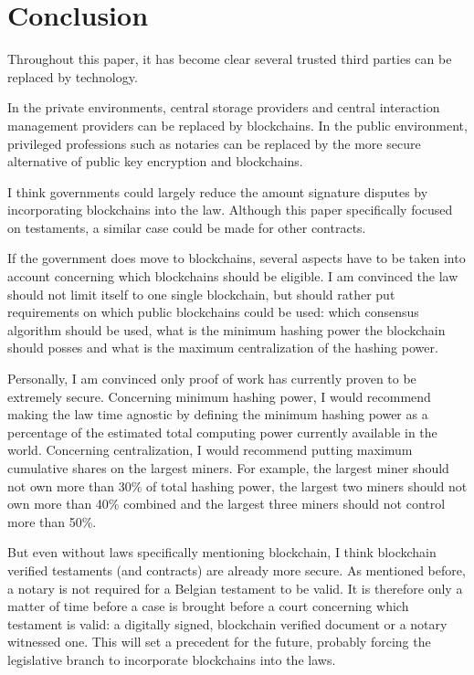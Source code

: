 \chapter{Conclusion}

Throughout this paper, it has become clear several trusted third parties can be replaced by technology. 

In the private environments, central storage providers and central interaction management providers can be replaced by blockchains. In the public environment, privileged professions such as notaries can be replaced by the more secure alternative of public key encryption and blockchains.

I think governments could largely reduce the amount signature disputes by incorporating blockchains into the law. Although this paper specifically focused on testaments, a similar case could be made for other contracts. 

If the government does move to blockchains, several aspects have to be taken into account concerning which blockchains should be eligible. I am convinced the law should not limit itself to one single blockchain, but should rather put requirements on which public blockchains could be used: which consensus algorithm should be used, what is the minimum hashing power the blockchain should posses and what is the maximum centralization of the hashing power. 

Personally, I am convinced only proof of work has currently proven to be extremely secure. Concerning minimum hashing power, I would recommend making the law time agnostic by defining the minimum hashing power as a percentage of the estimated total computing power currently available in the world. Concerning centralization, I would recommend putting maximum cumulative shares on the largest miners. For example, the largest miner should not own more than 30\% of total hashing power, the largest two miners should not own more than 40\% combined and the largest three miners should not control more than 50\%. 

But even without laws specifically mentioning blockchain, I think blockchain verified testaments (and contracts) are already more secure. As mentioned before, a notary is not required for a Belgian testament to be valid. It is therefore only a matter of time before a case is brought before a court concerning which testament is valid: a digitally signed, blockchain verified document or a notary witnessed one. This will set a precedent for the future, probably forcing the legislative branch to incorporate blockchains into the laws.

